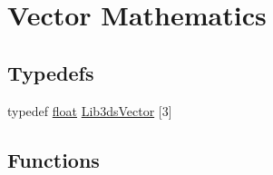 \hypertarget{group__vector}{\section{Vector Mathematics}
\label{group__vector}
}
\subsection*{Typedefs}
\begin{DoxyCompactItemize}
\item 
typedef \hyperlink{_super_l_u_support_8h_a6a1bb6ed41f44b60e7bd83b0e9945aa7}{float} \hyperlink{group__vector_ga6ac1c3b3ef15381ebf6baf264d658dcf}{Lib3ds\-Vector} \mbox{[}3\mbox{]}
\end{DoxyCompactItemize}
\subsection*{Functions}
